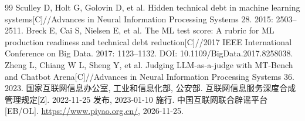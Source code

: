 \documentclass[12pt,a4paper,fontset=windows]{ctexart}
\begin{document}
\begin{thebibliography}{99}
 Sculley D, Holt G, Golovin D, et al. Hidden technical debt in machine learning systems[C]//Advances in Neural Information Processing Systems 28. 2015: 2503--2511.
 Breck E, Cai S, Nielsen E, et al. The ML test score: A rubric for ML production readiness and technical debt reduction[C]//2017 IEEE International Conference on Big Data. 2017: 1123--1132. DOI: 10.1109/BigData.2017.8258038.
 Zheng L, Chiang W L, Sheng Y, et al. Judging LLM-as-a-judge with MT-Bench and Chatbot Arena[C]//Advances in Neural Information Processing Systems 36. 2023.
 国家互联网信息办公室, 工业和信息化部, 公安部. 互联网信息服务深度合成管理规定[Z]. 2022-11-25 发布, 2023-01-10 施行.
 中国互联网联合辟谣平台[EB/OL]. \url{https://www.piyao.org.cn/}, 2026-11-25.
\end{thebibliography}
\end{document}
